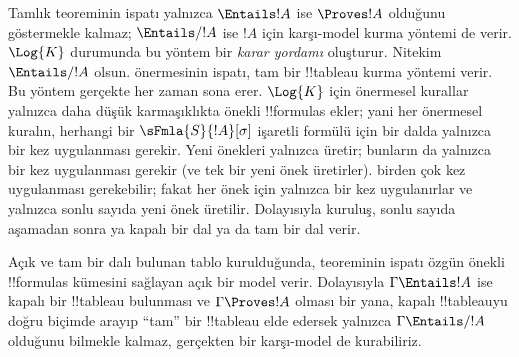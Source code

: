 

      

\begin{explain}
  Tamlık teoreminin ispatı yalnızca $\Entails !A$ ise $\Proves !A$ olduğunu
  göstermekle kalmaz; $\Entails/ !A$ ise $!A$ için karşı-model kurma yöntemi
  de verir. $\Log{K}$ durumunda bu yöntem bir \emph{karar yordamı} oluşturur.
  Nitekim $\Entails/ !A$ olsun. 
  önermesinin ispatı, tam bir !!{tableau} kurma yöntemi verir. Bu yöntem
  gerçekte her zaman sona erer. $\Log{K}$ için önermesel kurallar yalnızca daha
  düşük karmaşıklıkta önekli !!{formula}s ekler; yani her önermesel kuralın,
  herhangi bir $\sFmla{S}{!A}[\sigma]$ işaretli formülü için bir dalda yalnızca
  bir kez uygulanması gerekir. Yeni önekleri yalnızca
   üretir; bunların da
  yalnızca bir kez uygulanması gerekir (ve tek bir yeni önek üretirler).
   birden çok kez
  uygulanması gerekebilir; fakat her önek için yalnızca bir kez uygulanırlar
  ve yalnızca sonlu sayıda yeni önek üretilir. Dolayısıyla kuruluş, sonlu sayıda
  aşamadan sonra ya kapalı bir dal ya da tam bir dal verir.

  Açık ve tam bir dalı bulunan tablo kurulduğunda,
   teoreminin ispatı özgün önekli
  !!{formula}s kümesini sağlayan açık bir model verir. Dolayısıyla
  $\Gamma \Entails !A$ ise kapalı bir !!{tableau} bulunması ve
  $\Gamma \Proves !A$ olması bir yana, kapalı !!{tableau}{}yu doğru biçimde
  arayıp ``tam'' bir !!{tableau} elde edersek yalnızca
  $\Gamma \Entails/ !A$ olduğunu bilmekle kalmaz, gerçekten bir karşı-model de
  kurabiliriz.
\end{explain}

